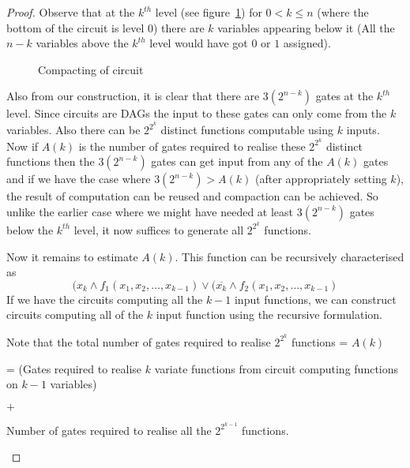 \begin{proof}
Observe that at the $k^{th}$ level (see figure~\ref{figure8}) for $0 < k \le n$ 
(where the bottom of the circuit is level 0) there are $k$ variables appearing
below it (All the $n-k$ variables above the $k^{th}$ level would have got
$0$ or $1$ assigned).
\begin{figure}[htp!]
\centering

\caption{Compacting of circuit}
\label{figure8}
\end{figure}

Also from our construction, it is clear that there are $3(2^{n-k})$ gates at
the $k^{th}$ level. Since circuits are DAGs the input to these gates can only
come from the $k$ variables. Also there can be $2^{2^k}$ distinct functions
computable using $k$ inputs. Now if $A(k)$ is the number of gates required to
realise these $2^{2^k}$ distinct functions then the $3(2^{n-k})$ gates can get
input from any of the $A(k)$ gates and if we have the case where $3(2^{n-k}) >
A(k)$ (after appropriately setting $k$), the result of computation can be
reused and compaction can be achieved. So unlike the earlier case where we
might have needed at least $3(2^{n-k})$ gates below the $k^{th}$ level, it now
suffices to generate all $2^{2^k}$ functions.

Now it remains to estimate $A(k)$. This function can be recursively
characterised as \[(x_k \land f_1(x_1,x_2,\ldots,x_{k-1}) \lor (\overline{x_k}
\land f_2(x_1,x_2,\ldots,x_{k-1})\] If we have the circuits computing all 
the $k-1$ input functions, we can construct circuits computing 
all of the $k$ input function using the recursive formulation.

Note that the total number of gates required to realise $2^{2^k}$ functions =
$ A(k) $ 
\begin{center} = (Gates required to realise $k$ variate functions from circuit
computing functions on $k-1$ variables) 

$+$ 

Number of gates required to realise all the $2^{2^{k-1}}$ functions.
\end{center}


\end{proof}

